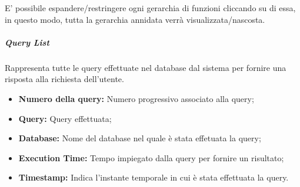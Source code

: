 E' possibile espandere/restringere ogni gerarchia di funzioni cliccando su di essa, in questo modo, tutta la gerarchia annidata verrà visualizzata/nascosta.
   

\subparagraph {Query List} \Spazio
Rappresenta tutte le query effettuate nel database dal sistema per fornire una risposta alla richiesta dell'utente.
    \begin{itemize}
	
	\item \textbf{Numero della query:} Numero progressivo associato alla query;
	\item \textbf{Query:} Query effettuata;
	\item \textbf{Database:} Nome del database nel quale è stata effetuata la query;
	\item \textbf{Execution Time:} Tempo impiegato dalla query per fornire un risultato;
	\item \textbf{Timestamp:} Indica l'instante temporale in cui è stata effettuata la query.
	
\end{itemize}







